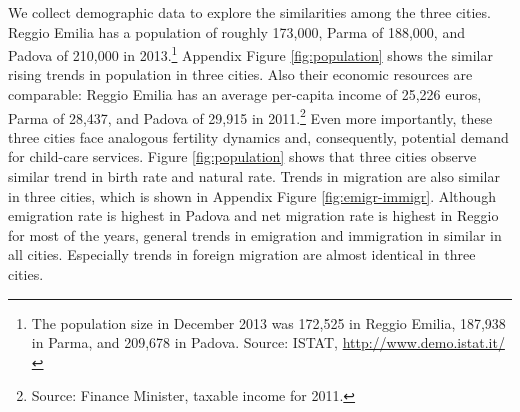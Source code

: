 We collect demographic data to explore the similarities among the three cities. Reggio Emilia has a population of roughly 173,000, Parma of 188,000, and Padova of 210,000 in 2013.\footnote{The population size in December 2013 was 172,525 in Reggio Emilia, 187,938 in Parma, and 209,678 in Padova. Source: ISTAT, \url{http://www.demo.istat.it/}} Appendix Figure \ref{fig:population} shows the similar rising trends in population in three cities. Also their economic resources are comparable: Reggio Emilia has an average per-capita income of 25,226 euros, Parma of 28,437, and Padova of 29,915 in 2011.\footnote{Source: Finance Minister, taxable income for 2011.}
Even more importantly, these three cities face analogous fertility dynamics and, consequently, potential demand for child-care services. Figure \ref{fig:population} shows that three cities observe similar trend in birth rate and natural rate. Trends in migration are also similar in three cities, which is shown in Appendix Figure \ref{fig:emigr-immigr}. Although emigration rate is highest in Padova and net migration rate is highest in Reggio for most of the years, general trends in emigration and immigration in similar in all cities. Especially trends in foreign migration are almost identical in three cities.

